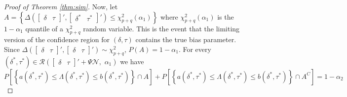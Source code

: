 \begin{proof}[Proof of Theorem \ref{thm:sim}]
Now, let $A = \left \{\Delta \left( \begin{bmatrix}
\delta & \tau
\end{bmatrix}', \begin{bmatrix}
\delta^{*} & \tau^{*}
\end{bmatrix}' \right) \leq \chi_{p+q}^2(\alpha_1)  \right \}$ where $\chi_{p+q}^2(\alpha_1)$ is the $1-\alpha_1$ quantile of a $\chi_{p+q}^2$ random variable. This is the event that the limiting version of the confidence region for $(\delta, \tau)$ contains the true bias parameter. Since $\Delta \left( \begin{bmatrix}
\delta & \tau
\end{bmatrix}', \begin{bmatrix}
\delta & \tau
\end{bmatrix}' \right) \sim \chi_{p+q}^2$, $P(A) = 1-\alpha_1$. For every $(\delta^{*}, \tau^{*}) \in  \mathscr{R} \left( \begin{bmatrix}
\delta & \tau
\end{bmatrix}' + \Psi \mathscr{N}, \,\, \alpha_1 \right)$ we have
\[
P\left[\left\{ a(\delta^{*}, \tau^{*}) \leq \Lambda(\delta^{*}, \tau^{*}) \leq b(\delta^{*}, \tau^{*})  \right\} \cap A \right] + P\left[\left\{ a(\delta^{*}, \tau^{*}) \leq \Lambda(\delta^{*}, \tau^{*}) \leq b(\delta^{*}, \tau^{*})  \right\} \cap A^C \right] = 1-\alpha_2
\]


\end{proof}
